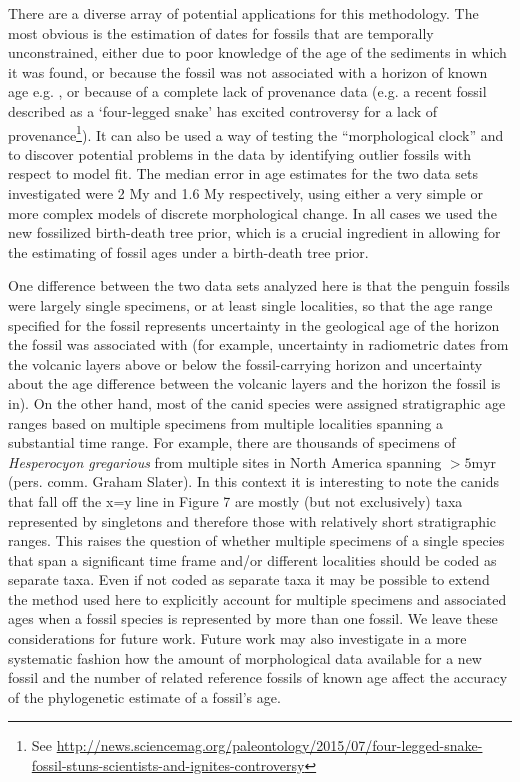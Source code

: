 \documentclass[11pt]{article}
\begin{document}
There are a diverse array of potential applications for this methodology. 
The most obvious is the estimation of dates for fossils that are temporally unconstrained, either due to poor knowledge of the age of the sediments in which it was found, 
or because the fossil was not associated with a horizon of known age e.g. \cite{Berger2015},
or because of a complete lack of provenance data (e.g. a recent fossil described as a `four-legged snake' has excited controversy for a lack of provenance\footnote{See \url{http://news.sciencemag.org/paleontology/2015/07/four-legged-snake-fossil-stuns-scientists-and-ignites-controversy}}). 
It can also be used a way of testing the ``morphological clock'' and to discover potential problems in the data by identifying outlier fossils with respect to model fit. 
The median error in age estimates for the two data sets investigated were 2 My and 1.6 My respectively, using either a very simple or more complex models of discrete morphological change. 
In all cases we used the new fossilized birth-death tree prior, which is a crucial ingredient in allowing for the estimating of fossil ages under a birth-death tree prior. 

One difference between the two data sets analyzed here is that the penguin fossils were largely single specimens, or at least single localities, so that the age range specified for the fossil represents uncertainty in the geological age of the horizon the fossil was associated with (for example, uncertainty in radiometric dates from the volcanic layers above or below the fossil-carrying horizon and uncertainty about the age difference between the volcanic layers and the horizon the fossil is in). 
On the other hand, most of the canid species were assigned stratigraphic age ranges based on multiple specimens from multiple localities spanning a substantial time range. 
For example, there are thousands of specimens of {\it Hesperocyon gregarious} from multiple sites in North America spanning $>5\text{myr}$ (pers. comm. Graham Slater). 
In this context it is interesting to note the canids that fall off the x=y line in Figure 7 are mostly (but not exclusively) taxa represented by singletons and therefore those with relatively short stratigraphic ranges. 
This raises the question of whether multiple specimens of a single species that span a significant time frame and/or different localities should be coded as separate taxa. Even if not coded as separate taxa it may be possible to extend the method used here to explicitly account for multiple specimens and associated ages when a fossil species is represented by more than one fossil. We leave these considerations for future work. 
Future work may also investigate in a more systematic fashion how the amount of morphological data available for a new fossil and the number of related reference fossils of known age affect the accuracy of the phylogenetic estimate of a fossil's age.
\end{document}
